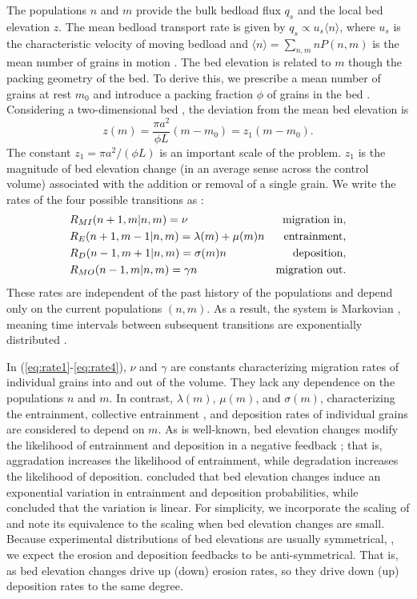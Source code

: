 \documentclass[draft]{agujournal2018}
\newcommand\be{\begin{equation}} %
\newcommand\ee{\end{equation}}   %
\newcommand\bra{\langle}
\newcommand\ket{\rangle}
\begin{document}
The populations $n$ and $m$ provide the bulk bedload flux $q_s$ and the local bed elevation $z$.
The mean bedload transport rate is given by $q_s \propto u_s \bra n \ket$, where $u_s$ is the characteristic velocity of moving bedload and $\bra n \ket = 
\sum_{n,m}nP(n,m) $ is the mean number of grains in motion \citep[e.g.][]{Charru2004, Ancey2008, Furbish2012a}.
The bed elevation is related to $m$ though the packing geometry of the bed.
To derive this, we prescribe a mean number of grains at rest $m_0$ and introduce a packing fraction $\phi$ of grains in the bed \citep{Torquato2018}.
Considering a two-dimensional bed \citep[e.g.][]{Einstein1950, Paintal1971}, the deviation from the mean bed elevation is
\be z(m) = \frac{\pi a^2}{\phi L}(m-m_0) = z_1(m-m_0). \label{eq:ele}\ee
The constant $z_1 = \pi a^2/(\phi L)$ is an important scale of the problem. 
$z_1$ is the magnitude of bed elevation change (in an average sense across the control volume) associated with the addition or removal of a single grain.
We write the rates of the four possible transitions as \citep[e.g.][]{Ancey2008}:
\begin{align}
 &R_{MI}(n+1,m|n,m) = \nu & \text{migration in}, \label{eq:rate1}\\
 &R_E(n+1,m-1|n,m) =\lambda(m) + \mu(m) n  & \text{entrainment},  \label{eq:rate2}\\
 &R_D(n-1,m+1|n,m) =\sigma(m) n & \text{deposition},\label{eq:rate3}\\
 &R_{MO}(n-1,m|n,m) =\gamma n & \text{migration out\label{eq:rate4}}.
\end{align}
These rates are independent of the past history of the populations and depend only on the current populations $(n,m)$. 
As a result, the system is Markovian \citep[e.g.][]{Cox1965, VanKampen1992}, meaning time intervals between subsequent transitions are exponentially distributed \citep[e.g.][]{Gillespie2007}.

In (\ref{eq:rate1}-\ref{eq:rate4}), $\nu$ and $\gamma$ are constants characterizing migration rates of individual grains into and out of the volume. 
They lack any dependence on the populations $n$ and $m$.
In contrast, $\lambda(m)$, $\mu(m)$, and $\sigma(m)$, characterizing the entrainment, collective entrainment \citep[e.g.][]{Ancey2008, Heyman2013, Heyman2014}, and deposition rates of individual grains are considered to depend on $m$.
As is well-known, bed elevation changes modify the likelihood of entrainment and deposition in a negative feedback \citep{Sawai1987, Wong2007}; that is, aggradation increases the likelihood of entrainment, while degradation increases the likelihood of deposition.
\citet{Wong2007} concluded that bed elevation changes induce an exponential variation in entrainment and deposition probabilities, while \citet{Sawai1987} concluded that the variation is linear.
For simplicity, we incorporate the scaling of \citet{Sawai1987} and note its equivalence to the \citet{Wong2007} scaling when bed elevation changes are small.
Because experimental distributions of bed elevations are usually symmetrical, \citep{Wong2007, Singh2009, Martin2014}, we expect the erosion and deposition feedbacks to be anti-symmetrical.
That is, as bed elevation changes drive up (down) erosion rates, so they drive down (up) deposition rates to the same degree.
\end{document}
